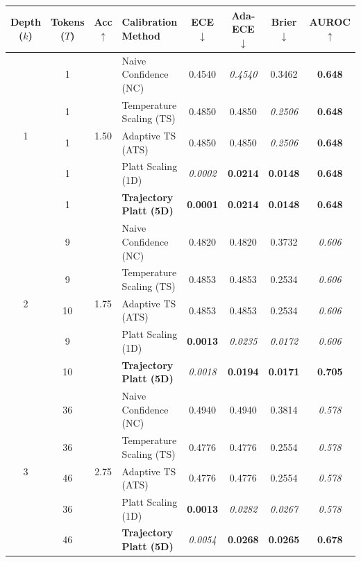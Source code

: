 \begin{table}[t]
\setlength{\tabcolsep}{4pt}
\renewcommand{\arraystretch}{1.05}
\centering
\footnotesize
\begin{tabular}{ccclcccc}
\toprule
\textbf{Depth ($k$)} & \textbf{Tokens ($T$)} & \textbf{Acc} $\uparrow$ & \textbf{Calibration Method} & \textbf{ECE} $\downarrow$ & \textbf{Ada-ECE} $\downarrow$ & \textbf{Brier} $\downarrow$ & \textbf{AUROC} $\uparrow$ \\
\midrule
\multirow{5}{*}{1} & 1 & \multirow{5}{*}{1.50} & Naive Confidence (NC) & 0.4540 & \textit{0.4540} & 0.3462 & \textbf{0.648} \\
 & 1 &  & Temperature Scaling (TS) & 0.4850 & 0.4850 & \textit{0.2506} & \textbf{0.648} \\
 & 1 &  & Adaptive TS (ATS) & 0.4850 & 0.4850 & \textit{0.2506} & \textbf{0.648} \\
 & 1 &  & Platt Scaling (1D) & \textit{0.0002} & \textbf{0.0214} & \textbf{0.0148} & \textbf{0.648} \\
 & 1 &  & \textbf{Trajectory Platt (5D)} & \textbf{0.0001} & \textbf{0.0214} & \textbf{0.0148} & \textbf{0.648} \\
\midrule
\multirow{5}{*}{2} & 9 & \multirow{5}{*}{1.75} & Naive Confidence (NC) & 0.4820 & 0.4820 & 0.3732 & \textit{0.606} \\
 & 9 &  & Temperature Scaling (TS) & 0.4853 & 0.4853 & 0.2534 & \textit{0.606} \\
 & 10 &  & Adaptive TS (ATS) & 0.4853 & 0.4853 & 0.2534 & \textit{0.606} \\
 & 9 &  & Platt Scaling (1D) & \textbf{0.0013} & \textit{0.0235} & \textit{0.0172} & \textit{0.606} \\
 & 10 &  & \textbf{Trajectory Platt (5D)} & \textit{0.0018} & \textbf{0.0194} & \textbf{0.0171} & \textbf{0.705} \\
\midrule
\multirow{5}{*}{3} & 36 & \multirow{5}{*}{2.75} & Naive Confidence (NC) & 0.4940 & 0.4940 & 0.3814 & \textit{0.578} \\
 & 36 &  & Temperature Scaling (TS) & 0.4776 & 0.4776 & 0.2554 & \textit{0.578} \\
 & 46 &  & Adaptive TS (ATS) & 0.4776 & 0.4776 & 0.2554 & \textit{0.578} \\
 & 36 &  & Platt Scaling (1D) & \textbf{0.0013} & \textit{0.0282} & \textit{0.0267} & \textit{0.578} \\
 & 46 &  & \textbf{Trajectory Platt (5D)} & \textit{0.0054} & \textbf{0.0268} & \textbf{0.0265} & \textbf{0.678} \\

\end{tabular}
\end{table}
